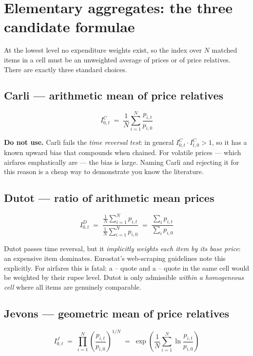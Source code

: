 \section{Elementary aggregates: the three candidate formulae}

At the lowest level no expenditure weights exist, so the index over $N$ matched items in a
cell must be an unweighted average of prices or of price relatives. There are exactly
three standard choices.

\subsection{Carli --- arithmetic mean of price relatives}
\begin{equation}
I^{C}_{0,t} \;=\; \frac{1}{N}\sum_{i=1}^{N} \frac{p_{i,t}}{p_{i,0}}
\end{equation}

\noindent \textbf{Do not use.} Carli fails the \emph{time reversal test}: in general
$I^C_{0,t}\cdot I^C_{t,0} > 1$, so it has a known upward bias that compounds when chained.
For volatile prices --- which airfares emphatically are --- the bias is large. Naming Carli
and rejecting it for this reason is a cheap way to demonstrate you know the literature.

\subsection{Dutot --- ratio of arithmetic mean prices}
\begin{equation}
I^{D}_{0,t} \;=\; \frac{\frac{1}{N}\sum_{i=1}^{N} p_{i,t}}{\frac{1}{N}\sum_{i=1}^{N} p_{i,0}}
\;=\; \frac{\sum_i p_{i,t}}{\sum_i p_{i,0}}
\end{equation}

\noindent Dutot passes time reversal, but it \emph{implicitly weights each item by its base
price}: an expensive item dominates. Eurostat's web-scraping guidelines note this
explicitly. For airfares this is fatal: a -- quote and a
-- quote in the same cell would be weighted by their rupee level. Dutot is
only admissible \emph{within a homogeneous cell} where all items are genuinely comparable.

\subsection{Jevons --- geometric mean of price relatives}
\begin{equation}
\boxed{\;
I^{J}_{0,t} \;=\; \prod_{i=1}^{N}\left(\frac{p_{i,t}}{p_{i,0}}\right)^{1/N}
\;=\; \exp\!\left(\frac{1}{N}\sum_{i=1}^{N}\ln\frac{p_{i,t}}{p_{i,0}}\right)\;}
\end{equation}

